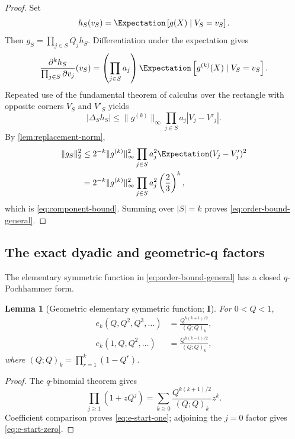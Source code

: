 \documentclass[11pt,oneside]{article}
\newtheorem{lemma}[theorem]{Lemma}
\theoremstyle{definition}
\theoremstyle{remark}
\newcommand{\statusI}{\textcolor{deepblue}{\textbf{I}}}
\begin{document}
\begin{proof}
Set
\[
 h_S(v_S)=\Expectation\left[g(X)\mid V_S=v_S\right].
\]
Then $g_S=\prod_{j\in S}Q_jh_S$.  Differentiation under the expectation gives
\begin{equation}
 \frac{\partial^kh_S}{\prod_{j\in S}\partial v_j}(v_S)
 =\left(\prod_{j\in S}a_j\right)
 \Expectation\left[g^{(k)}(X)\mid V_S=v_S\right].
 \label{eq:mixed-derivative-h}
\end{equation}
Repeated use of the fundamental theorem of calculus over the rectangle with
opposite corners $V_S$ and $V'_S$ yields
\[
 |\Delta_Sh_S|
 \le\|g^{(k)}\|_\infty
      \prod_{j\in S}a_j|V_j-V'_j|.
\]
By \cref{lem:replacement-norm},
\begin{align*}
 \|g_S\|_2^2
 &\le2^{-k}\|g^{(k)}\|_\infty^2
       \prod_{j\in S}a_j^2\Expectation(V_j-V'_j)^2\\
 &=2^{-k}\|g^{(k)}\|_\infty^2
       \prod_{j\in S}a_j^2\left(\frac23\right)^k,
\end{align*}
which is \eqref{eq:component-bound}.  Summing over $|S|=k$ proves
\eqref{eq:order-bound-general}.
\end{proof}

\subsection{The exact dyadic and geometric-q factors}

The elementary symmetric function in \eqref{eq:order-bound-general} has a
closed $q$-Pochhammer form.

\begin{lemma}[Geometric elementary symmetric function; \statusI]
\label{lem:geometric-e}
For $0<Q<1$,
\begin{align}
 e_k(Q,Q^2,Q^3,\ldots)
 &=\frac{Q^{k(k+1)/2}}{(Q;Q)_k},
 \label{eq:e-start-one}\\
 e_k(1,Q,Q^2,\ldots)
 &=\frac{Q^{k(k-1)/2}}{(Q;Q)_k},
 \label{eq:e-start-zero}
\end{align}
where $(Q;Q)_k=\prod_{r=1}^k(1-Q^r)$.
\end{lemma}

\begin{proof}
The $q$-binomial theorem gives
\[
 \prod_{j\ge1}(1+zQ^j)
 =\sum_{k\ge0}\frac{Q^{k(k+1)/2}}{(Q;Q)_k}z^k.
\]
Coefficient comparison proves \eqref{eq:e-start-one}; adjoining the $j=0$
factor gives \eqref{eq:e-start-zero}.
\end{proof}
\end{document}
